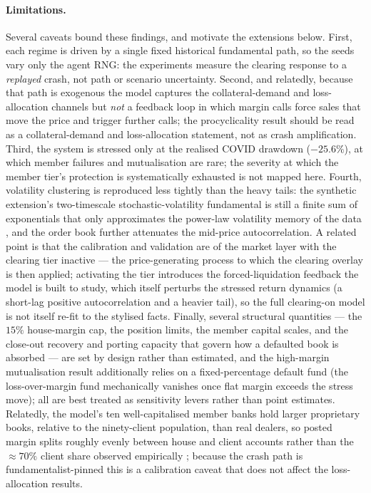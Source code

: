 \paragraph{Limitations.}
Several caveats bound these findings, and motivate the extensions below. First, each regime is driven by a
single fixed historical fundamental path, so the seeds vary only the agent RNG: the experiments measure the
clearing response to a \emph{replayed} crash, not path or scenario uncertainty. Second, and relatedly,
because that path is exogenous the model captures the collateral-demand and loss-allocation channels but
\emph{not} a feedback loop in which margin calls force sales that move the price and trigger further calls;
the procyclicality result should be read as a collateral-demand and loss-allocation statement, not as crash
amplification. Third, the system is
stressed only at the realised COVID drawdown ($-25.6\%$), at which member failures and mutualisation are
rare; the severity at which the member tier's protection is systematically exhausted is not mapped here.
Fourth, volatility clustering is reproduced less tightly than the heavy tails: the synthetic
extension's two-timescale stochastic-volatility fundamental is still a finite sum of exponentials that only
approximates the power-law volatility memory of the data \citep{barndorff_shephard_2001}, and the
order book further attenuates the mid-price autocorrelation. A related point is that the calibration
and validation are of the market layer with the clearing tier inactive --- the price-generating process
to which the clearing overlay is then applied; activating the tier introduces the forced-liquidation
feedback the model is built to study, which itself perturbs the stressed return dynamics (a short-lag
positive autocorrelation and a heavier tail), so the full clearing-on model is not itself re-fit to the
stylised facts. Finally, several structural quantities --- the
$15\%$ house-margin cap, the position limits, the member capital scales, and the close-out recovery and
porting capacity that govern how a defaulted book is absorbed --- are set by design rather than estimated,
and the high-margin mutualisation result additionally relies on a fixed-percentage default fund (the
loss-over-margin fund mechanically vanishes once flat margin exceeds the stress move); all are best treated
as sensitivity levers rather than point estimates. Relatedly, the model's ten well-capitalised member banks
hold larger proprietary books, relative to the ninety-client population, than real dealers, so posted margin
splits roughly evenly between house and client accounts rather than the $\approx\!70\%$ client share
observed empirically \citep{ofr_2026}; because the crash path is fundamentalist-pinned this is a calibration
caveat that does not affect the loss-allocation results.

